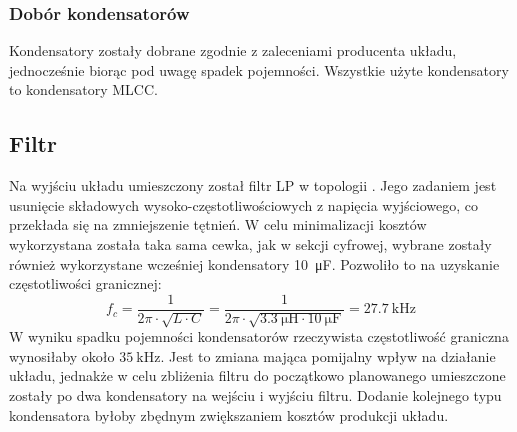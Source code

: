 \documentclass[11pt]{article}
\begin{document}
\subsubsection{Dobór kondensatorów}
Kondensatory zostały dobrane zgodnie z zaleceniami producenta układu, jednocześnie biorąc pod uwagę spadek pojemności. Wszystkie użyte kondensatory to kondensatory MLCC.

\subsection{Filtr}
Na wyjściu układu umieszczony został filtr LP w topologii \Pi. Jego zadaniem jest usunięcie składowych wysoko-częstotliwościowych z napięcia wyjściowego, co przekłada się na zmniejszenie tętnień. W celu minimalizacji kosztów wykorzystana została taka sama cewka, jak w sekcji cyfrowej, wybrane zostały również wykorzystane wcześniej kondensatory \SI{10}{\micro\farad}. Pozwoliło to na uzyskanie częstotliwości granicznej: $$f_c = \frac{1}{2\pi \cdot \sqrt{L \cdot C}} = \frac{1}{2\pi \cdot \sqrt{\SI{3.3}{\micro\henry} \cdot \SI{10}{\micro\farad}}} = \SI{27.7}{\kilo\hertz}$$
W wyniku spadku pojemności kondensatorów rzeczywista częstotliwość graniczna wynosiłaby około $\SI{35}{\kilo\hertz}$. Jest to zmiana mająca pomijalny wpływ na działanie układu, jednakże w celu zbliżenia filtru do początkowo planowanego umieszczone zostały po dwa kondensatory na wejściu i wyjściu filtru. Dodanie kolejnego typu kondensatora byłoby zbędnym zwiększaniem kosztów produkcji układu.
\end{document}

